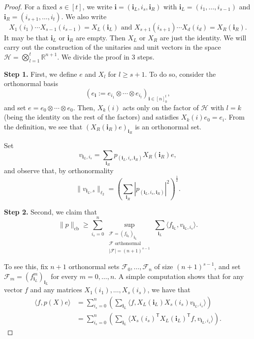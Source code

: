 \documentclass[10pt,a4paper]{amsart}
\newcommand{\R}{\mathbb{R}} %
\DeclareMathOperator{\cb}{cb}
\newcommand{\ind}[1]{\mathbf{#1}}
\newcommand{\norm}[1]{\|#1\|}
\begin{document}
\begin{proof}
For a fixed $s\in [t]$, we write $\ind i=({\ind{i}_L},i_s,{\ind{i}_R})$ with ${\ind{i}_L}=(i_1,\dots, i_{s-1})$ and ${\ind{i}_R}=(i_{s+1},\dots, i_t)$.  We also write 
$$X_1(i_1)\cdots X_{s-1}(i_{s-1})=X_{L}({\ind{i}_L}) \mbox{ and }X_{s+1}(i_{s+1})\cdots X_d(i_{d})=X_R({\ind{i}_R}).$$
It may be that ${\ind{i}_L}$ or ${\ind{i}_R}$ are empty. Then $X_L$ or $X_R$ are just the identity. We will carry out the construction of the unitaries and unit vectors in the space $\mathcal{H}=\bigotimes _{l=1}^t\R^{n+1}.$ We divide the proof in 3 steps.

{\bf Step 1.} First, we define $e$ and $X_l$ for $l\geq s+1.$ 
To do so, consider the  orthonormal basis $$(e_{\ind i}:=e_{i_{1}} \otimes \cdots \otimes e_{i_{t}})_{\ind i\in[n]_0^t},$$ and set $e=e_0\otimes \cdots\otimes e_0$. Then, $X_{k}(i)$ acts only on the factor of $\mathcal{H}$ with $l=k$ (being the identity on the rest of the factors) and satisfies $X_k(i)e_0=e_{i}$.   
From the definition, we see that $(X_{R}({\ind{i}_R})e)_{{{\ind{i}_R}}}$ is an orthonormal set. 
    

 Set $$v_{{\ind{i}_L},i_s}=\sum_{{\ind{i}_R}} p_{({\ind{i}_L},i_s,{\ind{i}_R})} X_R({\ind{i}_R}) e,$$ and observe that, by orthonormality 
\begin{equation}
\label{eq:orthonormalityv}\norm{v_{{\ind{i}_L},s}}_{\ell_2}= \left(\sum_{{\ind{i}_R}}  |p_{({\ind{i}_L},i_s,{\ind{i}_R})}|^2\right)^\frac12.\end{equation}

  {\bf Step 2.} Second, we claim that
\begin{equation}
\label{eq:step1}\norm{p}_{\cb}\geq \sum_{i_s=0}^n \sup _{\substack{\mathcal{F}=(f_{{\ind{i}_L}})_{{\ind{i}_L}}\\
\mathcal{F}\text{ orthonormal}\\|\mathcal{F}|=(n+1)^{s-1}}} \sum_{{\ind{i}_L}} \langle f_{{\ind{i}_L}}, v_{{\ind{i}_L},i_s}\rangle.\end{equation}


To see this, fix $n+1$ orthonormal sets $\mathcal{F}_0, \dots, \mathcal{F}_{n}$ of size $(n+1)^{s-1}$, and set $\mathcal{F}_m=(f^m_{{\ind{i}_L}})_{{\ind{i}_L}}$ for every $m=0,\ldots, n$. A simple computation shows that for any vector $f$ and any matrices  $X_1(i_1),\dots, X_s(i_s)$, we have that 
    \begin{align*}
        \langle f, p(X) e\rangle &=\sum_{i_s=0}^ n \left( \sum_{{\ind{i}_L}} \langle f, X_L({\ind{i}_L}) X_s(i_s) v_{{\ind{i}_L},i_s}\rangle\right) \\
         &=\sum_{i_s=0}^ n \left( \sum_{{\ind{i}_L}} \langle X_s(i_s) ^{\mathsf T} X_{L}({\ind{i}_L})^{\mathsf T} f,   v_{{\ind{i}_L},i_s}\rangle\right).
    \end{align*}



\end{proof}
\end{document}
